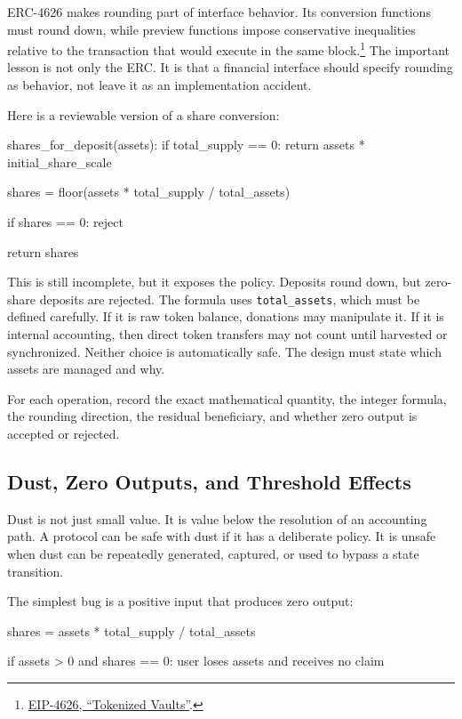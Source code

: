 ERC-4626 makes rounding part of interface behavior. Its conversion functions must round down, while preview functions impose conservative inequalities relative to the transaction that would execute in the same block.\footnote{\href{https://eips.ethereum.org/EIPS/eip-4626}{EIP-4626, ``Tokenized Vaults''}.} The important lesson is not only the ERC. It is that a financial interface should specify rounding as behavior, not leave it as an implementation accident.

Here is a reviewable version of a share conversion:

\begin{codeblock}
shares_for_deposit(assets):
    if total_supply == 0:
        return assets * initial_share_scale

    shares = floor(assets * total_supply / total_assets)

    if shares == 0:
        reject

    return shares
\end{codeblock}

This is still incomplete, but it exposes the policy. Deposits round down, but zero-share deposits are rejected. The formula uses \texttt{total\_assets}, which must be defined carefully. If it is raw token balance, donations may manipulate it. If it is internal accounting, then direct token transfers may not count until harvested or synchronized. Neither choice is automatically safe. The design must state which assets are managed and why.

\begin{artifactbox}
For each operation, record the exact mathematical quantity, the integer formula, the rounding direction, the residual beneficiary, and whether zero output is accepted or rejected.
\end{artifactbox}

\subsection{Dust, Zero Outputs, and Threshold Effects}

Dust is not just small value. It is value below the resolution of an accounting path. A protocol can be safe with dust if it has a deliberate policy. It is unsafe when dust can be repeatedly generated, captured, or used to bypass a state transition.

The simplest bug is a positive input that produces zero output:

\begin{codeblock}
shares = assets * total_supply / total_assets

if assets > 0 and shares == 0:
    user loses assets and receives no claim
\end{codeblock}

